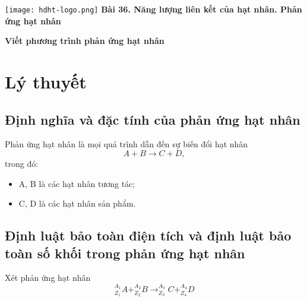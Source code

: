 \newcommand{\chapter}[2][]{
	\newcommand{\chapname}{#2}
	\begin{flushleft}
		\begin{minipage}[t]{\linewidth}
			\texttt{[image: hdht-logo.png]}
			\hspace{0pt}	
			\sffamily\bfseries\large Bài  36. Năng lượng liên kết của hạt nhân. Phản ứng hạt nhân
			\begin{flushleft}
				\huge\bfseries #1
			\end{flushleft}
		\end{minipage}
	\end{flushleft}
	\vspace{1cm}
	\normalfont\normalsize
}
\chapter[Viết phương trình phản ứng hạt nhân]{Viết phương trình phản ứng hạt nhân}
\section{Lý thuyết}

\subsection{Định nghĩa và đặc tính của phản ứng hạt nhân}
Phản ứng hạt nhân là mọi quá trình dẫn đến sự biến đổi hạt nhân
\begin{equation}
A+B\rightarrow C+D,
\end{equation}
trong đó:
\begin{itemize}
	\item A, B là các hạt nhân tương tác;
	\item C, D là các hạt nhân sản phẩm.
\end{itemize}

\subsection{Định luật bảo toàn điện tích và định luật bảo toàn số khối trong phản ứng hạt nhân}
Xét phản ứng hạt nhân
\begin{equation}
^{A_1}_{Z_1}A + ^{A_2}_{Z_2}B \rightarrow ^{A_3}_{Z_3}C + ^{A_4}_{Z_4}D
\end{equation}

